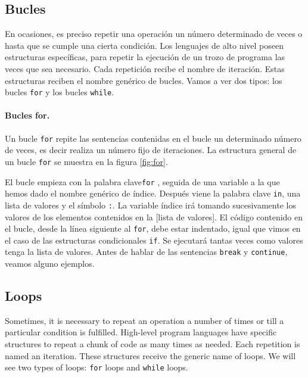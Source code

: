 \begin{paracol}{2}
\subsection{Bucles}
En ocasiones, es preciso repetir una operación un número determinado de veces o hasta que se cumple una cierta condición. Los lenguajes de alto nivel poseen estructuras específicas, para repetir la ejecución de un trozo de programa las veces que sea necesario. Cada repetición recibe el nombre de iteración. Estas estructuras reciben el nombre genérico de bucles. Vamos a ver dos tipos: los bucles \texttt{for} y los bucles \texttt{while}.

\paragraph{Bucles for.} Un bucle \texttt{for} repite las sentencias contenidas en el bucle un determinado número de veces, es decir realiza un número fijo de iteraciones. La estructura general de un bucle \texttt{for} se muestra en la figura \ref{fig:for}.

El bucle empieza con la palabra clave\texttt{for} , seguida de una variable a la que hemos dado el nombre genérico de índice. Después viene la palabra clave \texttt{in}, una lista de valores y el símbolo \texttt{:}. La variable índice irá tomando sucesivamente los valores de los elementos contenidos en la [lista de valores]. El código contenido en el bucle, desde la línea siguiente al \texttt{for}, debe estar indentado, igual que vimos en el caso de las estructuras condicionales \texttt{if}.  Se ejecutará tantas veces como valores tenga la lista de valores. Antes de hablar de las sentencias \texttt{break} y \texttt{continue}, veamos alguno ejemplos.

\switchcolumn
\subsection{Loops}
Sometimes, it is necessary to repeat an operation a number of times or till a particular condition is fulfilled. High-level program languages have specific structures to repeat a chunk of code as many times as needed. Each repetition is named an iteration. These structures receive the generic name of loops. We will see two types of loops: \texttt{for} loops and \texttt{while} loops.


\end{paracol}
